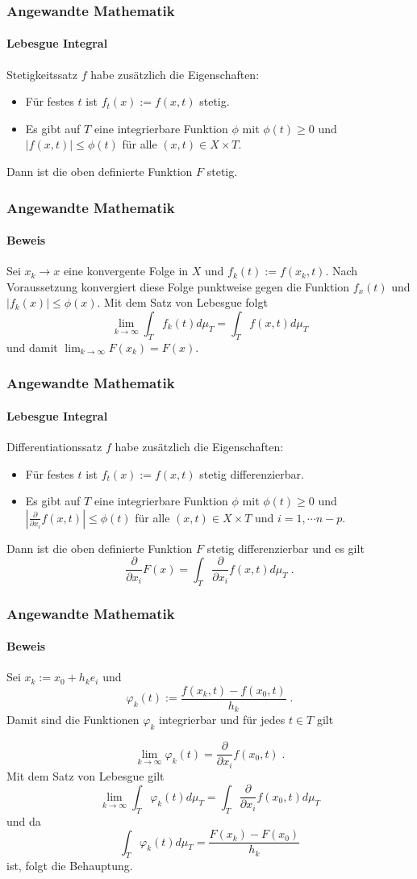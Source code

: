 \documentclass{beamer}
\begin{document}
\begin{frame}
    \frametitle{Angewandte Mathematik}
\framesubtitle{Lebesgue Integral}
\begin{block}{Stetigkeitssatz}
$f$ habe zusätzlich die Eigenschaften:
\begin{itemize}
\item Für festes $t$ ist $f_t(x):= f(x,t)$ stetig.
\item Es gibt auf $T$ eine integrierbare Funktion $\phi$ mit $\phi(t) \geq 0$ und $|f(x,t)| \leq \phi(t)$ für alle $(x,t) \in X \times T$.
\end{itemize}
Dann ist die oben definierte Funktion $F$ stetig. 
\end{block}
 \end{frame}


\begin{frame}
    \frametitle{Angewandte Mathematik}
\framesubtitle{Beweis}
Sei  $x_k \to x$   eine konvergente Folge in $X$ und $f_k(t):= f(x_k,t)$. Nach Voraussetzung konvergiert diese Folge punktweise gegen die Funktion $f_x(t)$ und $| f_k (x) | \leq \phi(x)$. Mit dem Satz von Lebesgue folgt
$$ \lim_{k \to \infty} \int_T f_k(t) d \mu_T = \int_T f(x,t) d \mu_T$$
und damit $ \lim_{k \to \infty} F(x_k) =  F(x)$.
 \end{frame}

\begin{frame}
    \frametitle{Angewandte Mathematik}
\framesubtitle{Lebesgue Integral}
\begin{block}{Differentiationssatz}
$f$ habe zusätzlich die Eigenschaften:
\begin{itemize}
\item Für festes $t$ ist $f_t(x):= f(x,t)$ stetig differenzierbar.
\item Es gibt auf $T$ eine integrierbare Funktion $\phi$ mit $\phi(t) \geq 0$ und $| \frac{\partial}{\partial x_i} f(x,t)| \leq \phi(t)$ für alle $(x,t) \in X \times T$ und $i=1, \cdots n-p$.
\end{itemize}
Dann ist die oben definierte Funktion $F$ stetig differenzierbar und es gilt
$$\frac{\partial}{\partial x_i} F(x)  = \int_T \frac{\partial}{\partial x_i} f(x,t) d \mu_T \; .$$ 
\end{block}
 \end{frame}

\begin{frame}
    \frametitle{Angewandte Mathematik}
\framesubtitle{Beweis}
Sei $x_k := x_0 + h_k e_i$ und 
$$ \varphi_k (t) := \frac{f(x_k,t)  - f(x_0,t)  }{h_k} \; .$$
Damit sind die Funktionen  $\varphi_k $ integrierbar und für jedes $t \in T$ gilt

$$  \lim_{k \to \infty} \varphi_k (t) = \frac{\partial}{\partial x_i}f(x_0, t) \; .$$
Mit dem Satz von Lebesgue gilt
$$ \lim_{k \to \infty}  \int_T \varphi_k (t) d \mu_T = \int_T   \frac{\partial}{\partial x_i}f(x_0, t) d \mu_T $$
und da 
$$  \int_T \varphi_k (t) d \mu_T = \frac{F(x_k) -F(x_0)}{h_k}$$ ist, folgt die Behauptung.
 \end{frame}
\end{document}
